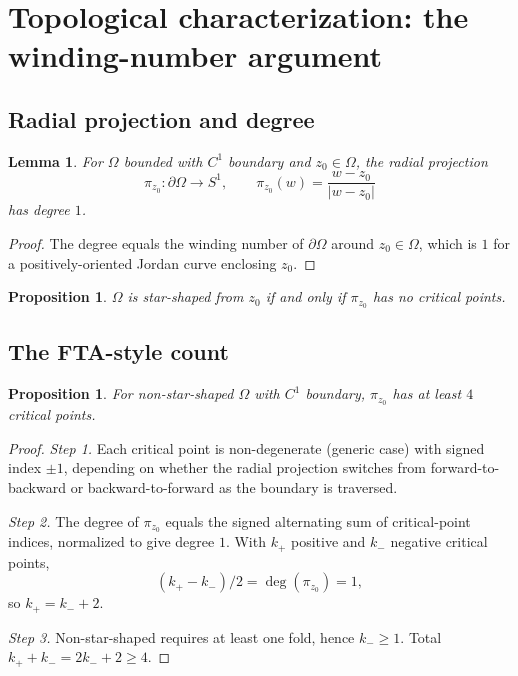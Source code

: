 \documentclass[11pt,reqno]{amsart}
\theoremstyle{plain}
\newtheorem{proposition}[theorem]{Proposition}
\newtheorem{lemma}[theorem]{Lemma}
\theoremstyle{definition}
\theoremstyle{remark}
\begin{document}
\section{Topological characterization: the winding-number argument}\label{sec:topological}

\subsection{Radial projection and degree}\label{ss:radial-degree-master}

\begin{lemma}\label{lem:radial-degree-master}
For $\Omega$ bounded with $C^1$ boundary and $z_0 \in \Omega$, the radial projection
\[
\pi_{z_0} \colon \partial\Omega \to S^1, \qquad \pi_{z_0}(w) = \frac{w - z_0}{|w - z_0|}
\]
has degree $1$.
\end{lemma}

\begin{proof}
The degree equals the winding number of $\partial\Omega$ around $z_0 \in \Omega$, which is $1$ for a positively-oriented Jordan curve enclosing $z_0$.
\end{proof}

\begin{proposition}\label{prop:star-iff-no-critical}
$\Omega$ is star-shaped from $z_0$ if and only if $\pi_{z_0}$ has no critical points.
\end{proposition}

\subsection{The FTA-style count}\label{ss:fta-style}

\begin{proposition}\label{prop:critical-count-master}
For non-star-shaped $\Omega$ with $C^1$ boundary, $\pi_{z_0}$ has at least $4$ critical points.
\end{proposition}

\begin{proof}
\emph{Step 1.} Each critical point is non-degenerate (generic case) with signed index $\pm 1$, depending on whether the radial projection switches from forward-to-backward or backward-to-forward as the boundary is traversed.

\emph{Step 2.} The degree of $\pi_{z_0}$ equals the signed alternating sum of critical-point indices, normalized to give degree $1$. With $k_+$ positive and $k_-$ negative critical points,
\[
(k_+ - k_-)/2 = \deg(\pi_{z_0}) = 1,
\]
so $k_+ = k_- + 2$.

\emph{Step 3.} Non-star-shaped requires at least one fold, hence $k_- \geq 1$. Total $k_+ + k_- = 2k_- + 2 \geq 4$.
\end{proof}
\end{document}
